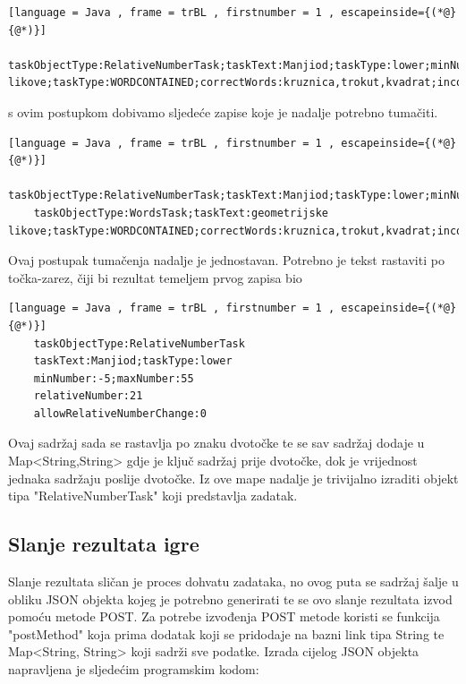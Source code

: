 \documentclass[times, utf8, zavrsni, numeric]{fer}
\begin{document}
	
	\begin{lstlisting}[language = Java , frame = trBL , firstnumber = 1 , escapeinside={(*@}{@*)}]
	taskObjectType:RelativeNumberTask;taskText:Manjiod;taskType:lower;minNumber:-5;maxNumber:55;relativeNumber:21;allowRelativeNumberChange:0#DELIMITER#taskObjectType:WordsTask;taskText:geometrijske likove;taskType:WORDCONTAINED;correctWords:kruznica,trokut,kvadrat;incorrectWords:piramida,valjak,sfera
	\end{lstlisting}
	s ovim postupkom dobivamo sljedeće zapise koje je nadalje potrebno tumačiti.
	\begin{lstlisting}[language = Java , frame = trBL , firstnumber = 1 , escapeinside={(*@}{@*)}]
	taskObjectType:RelativeNumberTask;taskText:Manjiod;taskType:lower;minNumber:-5;maxNumber:55;relativeNumber:21;allowRelativeNumberChange:0
	taskObjectType:WordsTask;taskText:geometrijske likove;taskType:WORDCONTAINED;correctWords:kruznica,trokut,kvadrat;incorrectWords:piramida,valjak,sfera
	\end{lstlisting}
	Ovaj postupak tumačenja nadalje je jednostavan. Potrebno je tekst rastaviti po točka-zarez, čiji bi rezultat temeljem prvog zapisa bio
	\begin{lstlisting}[language = Java , frame = trBL , firstnumber = 1 , escapeinside={(*@}{@*)}]
	taskObjectType:RelativeNumberTask
	taskText:Manjiod;taskType:lower
	minNumber:-5;maxNumber:55
	relativeNumber:21
	allowRelativeNumberChange:0
	\end{lstlisting}
	Ovaj sadržaj sada se rastavlja po znaku dvotočke te se sav sadržaj dodaje u Map<String,String> gdje je ključ sadržaj prije dvotočke, dok je vrijednost jednaka sadržaju poslije dvotočke.
	Iz ove mape nadalje je trivijalno izraditi objekt tipa "RelativeNumberTask" koji predstavlja zadatak. 


	\subsection{Slanje rezultata igre}
	Slanje rezultata sličan je proces dohvatu zadataka, no ovog puta se sadržaj šalje u obliku JSON objekta kojeg je potrebno generirati te se ovo slanje rezultata izvod pomoću metode POST\cite{post}. 
	Za potrebe izvođenja POST metode koristi se funkcija "postMethod" koja prima dodatak koji se pridodaje na bazni link tipa String te Map<String, String> koji sadrži sve podatke. 
	Izrada cijelog JSON objekta napravljena je sljedećim programskim kodom:
	
\end{document}

